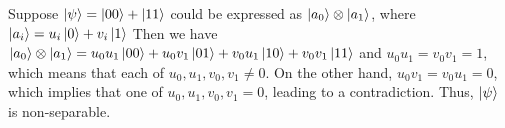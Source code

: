 \documentclass[all.tex]{subfiles}
\begin{document}
\ignorespaces
\parindent 0pt

\par Suppose $\ket{\psi} = \ket{00} + \ket{11}$ could be expressed as $\ket{a_0}
\otimes \ket{a_1}$, where $\ket{a_i} = u_i \ket{0} + v_i \ket{1}$ Then we have
$\ket{a_0} \otimes \ket{a_1} = u_0 u_1 \ket{00} + u_0 v_1 \ket{01} + v_0 u_1
\ket{10} + v_0 v_1 \ket{11}$ and $u_0 u_1 = v_0 v_1 = 1$, which means that each
of $u_0, u_1, v_0, v_1 \ne 0$. On the other hand, $u_0 v_1 = v_0 u_1 = 0$, which
implies that one of $u_0, u_1, v_0, v_1 = 0$, leading to a contradiction. Thus,
$\ket{\psi}$ is non-separable.
\end{document}
